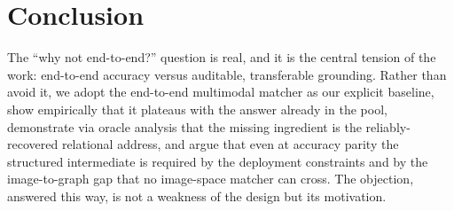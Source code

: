 \section{Conclusion}

The ``why not end-to-end?'' question is real, and it is the central tension of the work: end-to-end
accuracy versus auditable, transferable grounding. Rather than avoid it, we adopt the end-to-end
multimodal matcher as our explicit baseline, show empirically that it plateaus with the answer
already in the pool, demonstrate via oracle analysis that the missing ingredient is the
reliably-recovered relational address, and argue that even at accuracy parity the structured
intermediate is required by the deployment constraints and by the image-to-graph gap that no
image-space matcher can cross. The objection, answered this way, is not a weakness of the design but
its motivation.
